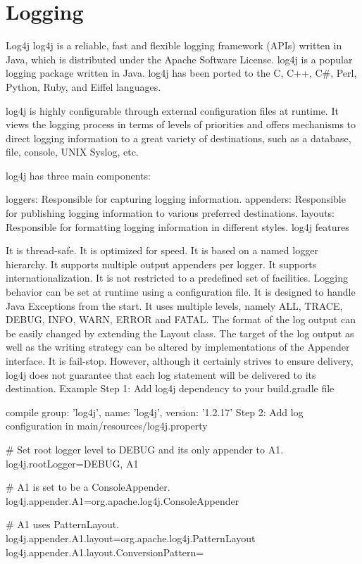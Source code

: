 \chapter{Logging}

Log4j
log4j is a reliable, fast and flexible logging framework (APIs) written in Java, which is distributed under the Apache Software License. log4j is a popular logging package written in Java. log4j has been ported to the C, C++, C#, Perl, Python, Ruby, and Eiffel languages.

log4j is highly configurable through external configuration files at runtime. It views the logging process in terms of levels of priorities and offers mechanisms to direct logging information to a great variety of destinations, such as a database, file, console, UNIX Syslog, etc.

log4j has three main components:

loggers: Responsible for capturing logging information.
appenders: Responsible for publishing logging information to various preferred destinations.
layouts: Responsible for formatting logging information in different styles.
log4j features

It is thread-safe.
It is optimized for speed.
It is based on a named logger hierarchy.
It supports multiple output appenders per logger.
It supports internationalization.
It is not restricted to a predefined set of facilities.
Logging behavior can be set at runtime using a configuration file.
It is designed to handle Java Exceptions from the start.
It uses multiple levels, namely ALL, TRACE, DEBUG, INFO, WARN, ERROR and FATAL.
The format of the log output can be easily changed by extending the Layout class.
The target of the log output as well as the writing strategy can be altered by implementations of the Appender interface.
It is fail-stop. However, although it certainly strives to ensure delivery, log4j does not guarantee that each log statement will be delivered to its destination.
Example
Step 1: Add log4j dependency to your build.gradle file

compile group: 'log4j', name: 'log4j', version: '1.2.17'
Step 2: Add log configuration in main/resources/log4j.property

# Set root logger level to DEBUG and its only appender to A1.
log4j.rootLogger=DEBUG, A1

# A1 is set to be a ConsoleAppender.
log4j.appender.A1=org.apache.log4j.ConsoleAppender

# A1 uses PatternLayout.
log4j.appender.A1.layout=org.apache.log4j.PatternLayout
log4j.appender.A1.layout.ConversionPattern=%


